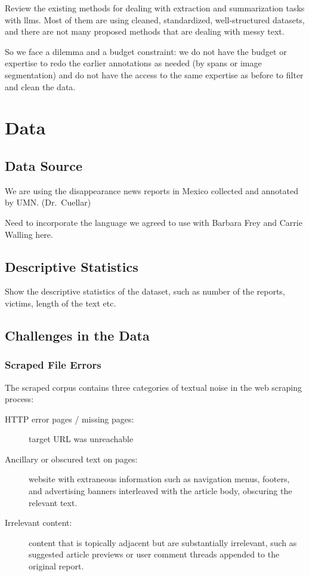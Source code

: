 \documentclass{article}
\begin{document}
Review the existing methods for dealing with extraction and
summarization tasks with llms. Most of them are using cleaned,
standardized, well-structured datasets, and there are not many proposed
methods that are dealing with messy text.

So we face a dilemma and a budget constraint: we do not have the budget or expertise to redo the earlier annotations as needed (by spans or image segmentation) and do not have the access to the same expertise as before to filter and clean the data.    

\section{Data}\label{data}

\subsection{Data Source}\label{data-source}

We are using the disappearance news reports in Mexico collected and
annotated by UMN. (Dr.~Cuellar)

Need to incorporate the language we agreed to use with Barbara Frey and Carrie Walling here.

\subsection{Descriptive Statistics}\label{descriptive-statistics}

Show the descriptive statistics of the dataset, such as number of the
reports, victims, length of the text etc.

\subsection{Challenges in the Data}\label{challenges-in-the-data}

\subsubsection{Scraped File Errors}\label{scraped-file-errors}

The scraped corpus contains three categories of textual noise in the web scraping process: 
\begin{description}
    \item[HTTP error pages / missing pages:] target URL was unreachable
    \item[Ancillary or obscured text on pages:] website with
    extraneous information such as navigation menus, footers, and
    advertising banners interleaved with the article body, obscuring the
    relevant text.
    \item[Irrelevant content:]  content that is
topically adjacent but are substantially irrelevant, such as suggested
article previews or user comment threads appended to the original
report.
\end{description}
 
\end{document}
